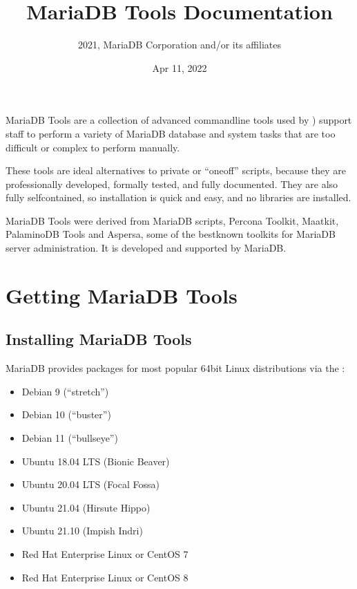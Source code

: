 \documentclass[letterpaper,10pt,english]{sphinxmanual}
\title{MariaDB Tools Documentation}
\date{Apr 11, 2022}
\author{2021, MariaDB Corporation and/or its affiliates}
\begin{document}
\pagestyle{empty}
\sphinxmaketitle
\pagestyle{plain}
\sphinxtableofcontents
\pagestyle{normal}
\label{\detokenize{index::doc}}


MariaDB Tools are a collection of advanced command\sphinxhyphen{}line tools
used by ) support staff
to perform a variety of MariaDB database and system tasks
that are too difficult or complex to perform manually.

These tools are ideal alternatives to private or “one\sphinxhyphen{}off” scripts,
because they are professionally developed, formally tested,
and fully documented.
They are also fully self\sphinxhyphen{}contained,
so installation is quick and easy,
and no libraries are installed.

MariaDB Tools were derived from MariaDB scripts, Percona Toolkit,
Maatkit, PalaminoDB Tools and Aspersa,
some of the best\sphinxhyphen{}known toolkits for MariaDB server administration.
It is developed and supported by MariaDB.


\part{Getting MariaDB Tools}
\label{\detokenize{index:getting-mariadb-tools}}

\chapter{Installing MariaDB Tools}
\label{\detokenize{installation:installing-mariadb-tools}}\label{\detokenize{installation:install}}\label{\detokenize{installation::doc}}
MariaDB provides packages for most popular 64\sphinxhyphen{}bit Linux distributions via the :
\begin{itemize}
\item {} 
Debian 9 (“stretch”)

\item {} 
Debian 10 (“buster”)

\item {} 
Debian 11 (“bullseye”)

\item {} 
Ubuntu 18.04 LTS (Bionic Beaver)

\item {} 
Ubuntu 20.04 LTS (Focal Fossa)

\item {} 
Ubuntu 21.04 (Hirsute Hippo)

\item {} 
Ubuntu 21.10 (Impish Indri)

\item {} 
Red Hat Enterprise Linux or CentOS 7

\item {} 
Red Hat Enterprise Linux or CentOS 8

\end{itemize}
\end{document}
